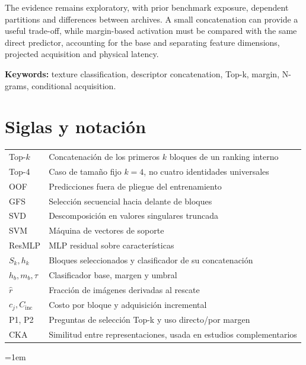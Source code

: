 \documentclass[12pt,a4paper]{report}
\begin{document}
The evidence remains exploratory, with prior benchmark exposure, dependent partitions and differences between archives. A small concatenation can provide a useful trade-off, while margin-based activation must be compared with the same direct predictor, accounting for the base and separating feature dimensions, projected acquisition and physical latency.

\textbf{Keywords:} texture classification, descriptor concatenation, Top-k, margin, N-grams, conditional acquisition.

\chapter*{Siglas y notación}
\begin{tabular}{@{}lp{10.6cm}@{}}
Top-\(k\) & Concatenación de los primeros \(k\) bloques de un ranking interno\\
Top-4 & Caso de tamaño fijo \(k=4\), no cuatro identidades universales\\
OOF & Predicciones fuera de pliegue del entrenamiento\\
GFS & Selección secuencial hacia delante de bloques\\
SVD & Descomposición en valores singulares truncada\\
SVM & Máquina de vectores de soporte\\
ResMLP & MLP residual sobre características\\
\(S_k,h_k\) & Bloques seleccionados y clasificador de su concatenación\\
\(h_b,m_b,\tau\) & Clasificador base, margen y umbral\\
\(\widehat r\) & Fracción de imágenes derivadas al rescate\\
\(c_j,C_{\mathrm{inc}}\) & Costo por bloque y adquisición incremental\\
P1, P2 & Preguntas de selección Top-k y uso directo/por margen\\
CKA & Similitud entre representaciones, usada en estudios complementarios\\
\end{tabular}
\tableofcontents
\listoffigures
{\emergencystretch=1em\listoftables}
\clearpage
{}








\appendix






\clearpage

\setlength{\bibsep}{3pt plus 1pt}

\end{document}
